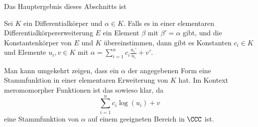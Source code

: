 \documentclass[12pt,a4paper,twoside]{article}
\begin{document}
Das Hauptergebnis dieses Abschnitts ist
\begin{Satz}[Liouville]
  Sei $K$ ein Differentialk\"orper und $\alpha\in K$. Falls es in einer
  elementaren Differentialk\"orpererweiterung $E$ ein Element $\beta$ mit
  $\beta'=\alpha$ gibt, und die Konstantenk\"orper von $E$ und $K$
  \"ubereinstimmen, dann gibt es Konstanten $c_i\in K$ und Elemente $u_i,v\in
  K$ mit $\alpha=\sum_{i=1}^nc_i\frac{u_i'}{u_i}+v'$.
\end{Satz}
\begin{Bemerkung*}
  Man kann umgekehrt zeigen, dass ein $\alpha$ der angegebenen Form eine
  Stammfunktion in einer elementaren Erweiterung von $K$ hat. Im Kontext
  meromomorpher Funktionen ist das sowieso klar, da
\[
\sum_{i=1}^nc_i\log(u_i)+v
\]
eine Stammfunktion von $\alpha$ auf einem geeigneten Bereich in $\CCC$ ist.
\end{Bemerkung*}
\end{document}
